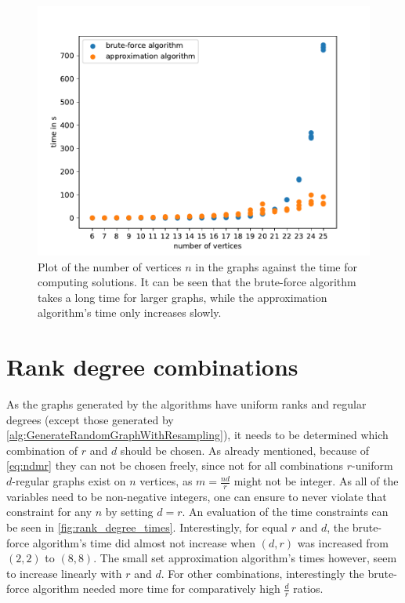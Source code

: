 \begin{figure}[htpb]
	\centering
	\includegraphics[scale=0.8]{figures/number_vertices_all_logs.pdf}
	\caption[Plot graph size against time]{Plot of the number of vertices $n$ in the graphs against the time for computing solutions. It can be seen that the brute-force algorithm takes a long time for larger graphs, while the approximation algorithm's time only increases slowly.\label{fig:no_vertices_time}}
\end{figure}


\section{Rank degree combinations}

As the graphs generated by the algorithms have uniform ranks and regular degrees (except those generated by \cref{alg:GenerateRandomGraphWithResampling}), it needs to be determined which combination of $r$ and $d$ should be chosen. As already mentioned, because of \cref{eq:ndmr} they can not be chosen freely, since not for all combinations $r$-uniform $d$-regular graphs exist on $n$ vertices, as $m = \frac{nd}{r}$ might not be integer. 
As all of the variables need to be non-negative integers, one can ensure to never violate that constraint for any $n$ by setting $d=r$. An evaluation of the time constraints can be seen in \cref{fig:rank_degree_times}. Interestingly, for equal $r$ and $d$, the brute-force algorithm's time did almost not increase when $(d,r)$ was increased from $(2,2)$ to $(8,8)$. The small set approximation algorithm's times however, seem to increase linearly with $r$ and $d$. For other combinations, interestingly the brute-force algorithm needed more time for comparatively high $\frac{d	}{r}$ ratios.

